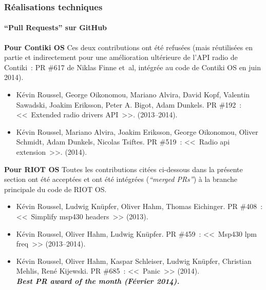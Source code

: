 \documentclass[10pt,c]{beamer}
\newcommand{\lang}[1]{\textit{#1}}
\renewcommand{\emph}[1]{\textbf{\textit{#1}}}
\begin{document}
\begin{frame}[allowframebreaks]  %
\frametitle{Réalisations techniques}
\framesubtitle{``Pull Requests'' sur GitHub}

\tiny

\textbf{Pour Contiki OS}
Ces deux contributions ont été refusées (mais réutilisées en partie et
indirectement pour une amélioration ultérieure de l'API radio de Contiki~:
PR \#617 de Niklas Finne et~al, intégrée au code de Contiki OS en juin 2014).

\begin{itemize}
\item Kévin Roussel, George Oikonomou, Mariano Alvira, David Kopf,
      Valentin Sawadski, Joakim Eriksson, Peter A. Bigot, Adam Dunkels.
PR \#192~: <<~Extended radio drivers API~>>.
(2013--2014).
\item Kévin Roussel, Mariano Alvira, Joakim Eriksson, George Oikonomou,
      Oliver Schmidt, Adam Dunkels, Nicolas Tsiftes.
PR \#519~: <<~Radio api extension~>>.
(2014).
\end{itemize}

\textbf{Pour RIOT OS}
Toutes les contributions citées ci-dessous dans la présente section
ont été acceptées et ont été intégrées (\lang{``merged PRs''})
à la branche principale du code de RIOT OS.

\begin{itemize}
\item Kévin Roussel, Ludwig Knüpfer, Oliver Hahm, Thomas Eichinger.
PR \#408~: <<~Simplify msp430 headers~>>
(2013).
\item Kévin Roussel, Oliver Hahm, Ludwig Knüpfer.
PR \#459~: <<~Msp430 lpm freq~>>
(2013--2014).
\item Kévin Roussel, Oliver Hahm, Kaspar Schleiser, Ludwig Knüpfer,
      Christian Mehlis, René Kijewski.
PR \#685~: <<~Panic~>>
(2014).\\
\emph{Best PR award of the month (Février 2014).}


\end{itemize}
\end{frame}
\end{document}
